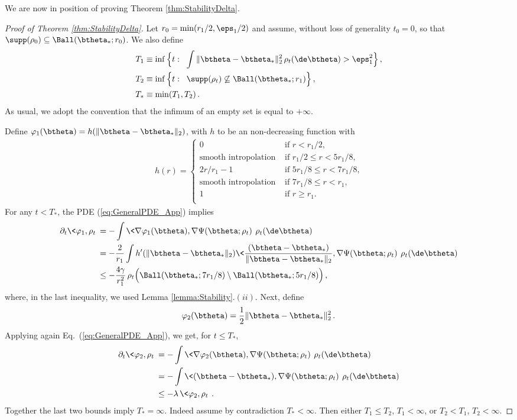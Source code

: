 \documentclass[11pt]{article}
\begin{document}
We are now in position of proving Theorem  \ref{thm:StabilityDelta}.
%
\begin{proof}[Proof of Theorem  \ref{thm:StabilityDelta}]
Let $r_0=\min(r_1/2,\eps_1/2)$ and assume, without loss of generality $t_0=0$,
so that $\supp(\rho_0)\subseteq\Ball(\btheta_*;r_0)$.  We also define
%
\begin{align}
%
T_{1} & \equiv \inf\Big\{ t:\;\; \int \|\btheta-\btheta_*\|_2^2\, \rho_t(\de\btheta)> \eps_1^2\Big\}\, ,\\
T_{2} & \equiv \inf\Big\{ t:\;\; \supp(\rho_t)\not\subseteq \Ball(\btheta_*;r_1)\Big\}\, ,\\
T_* &\equiv \min(T_1,T_2)\, .
%
\end{align}
%
As usual, we adopt the convention that the infimum of an empty set is equal to $+\infty$.

Define $\varphi_1(\btheta) = h(\| \btheta - \btheta_* \|_2)$, with $h$ to be an non-decreasing function with
\begin{align}
%
h(r) = \begin{cases}
0 & \mbox{ if $r < r_1/2$,}\\
\text{smooth intropolation} & \mbox{ if $r_1/2 \le r < 5r_1 / 8$,}\\
2r/r_1-1 & \mbox{ if $5r_1/8 \le r < 7r_1/8$,}\\
\text{smooth intropolation} & \mbox{ if $7 r_1/8 \le r < r_1$,}\\
1 & \mbox{ if $r \ge r_1$.}\\
\end{cases}
%
\end{align}
%
For any $t<T_*$, the PDE (\ref{eq:GeneralPDE_App}) implies
%
\begin{align}
%
\partial_t\<\varphi_1,\rho_t\> & = -\int \<\nabla \varphi_1(\btheta),\nabla\Psi(\btheta;\rho_t)\> \, \rho_t(\de\btheta)\\
& = -\frac{2}{r_1}\int h'(\| \btheta - \btheta_* \|_2)\<\frac{(\btheta-\btheta_*)}{\|\btheta-\btheta_*\|_2},\nabla\Psi(\btheta;\rho_t)\> \, \rho_t(\de\btheta)\\
& \le -\frac{4\gamma}{r_1^2}\, \rho_t\Big(\Ball(\btheta_*;7r_1/8)\setminus\Ball(\btheta_*;5r_1/8)\Big)\, ,\label{eq:Bounded}
%
\end{align}
%
where, in the last inequality, we used Lemma \ref{lemma:Stability}.$(ii)$.
Next, define 
%
\begin{align}
%
\varphi_2(\btheta) = \frac{1}{2}\|\btheta-\btheta_*\|_2^2\, .
%
\end{align}
%
Applying again  Eq.~(\ref{eq:GeneralPDE_App}), we get, for $t\le T_*$, 
%
\begin{align}
%
\partial_t\<\varphi_2,\rho_t\> & = -\int \<\nabla \varphi_2(\btheta),\nabla\Psi(\btheta;\rho_t)\> \, \rho_t(\de\btheta)\\
&  = -\int \<(\btheta-\btheta_*),\nabla\Psi(\btheta;\rho_t)\> \, \rho_t(\de\btheta)\\
& \le -\lambda\, \<\varphi_2,\rho_t\>\, .\label{eq:Contraction}
%
\end{align}
%
Together the last two bounds imply $T_*=\infty$. Indeed assume by contradiction $T_*<\infty$. 
Then either $T_1\le T_2$, $T_1<\infty$, or $T_2 < T_1$, $T_2<\infty$.


\end{proof}
\end{document}
